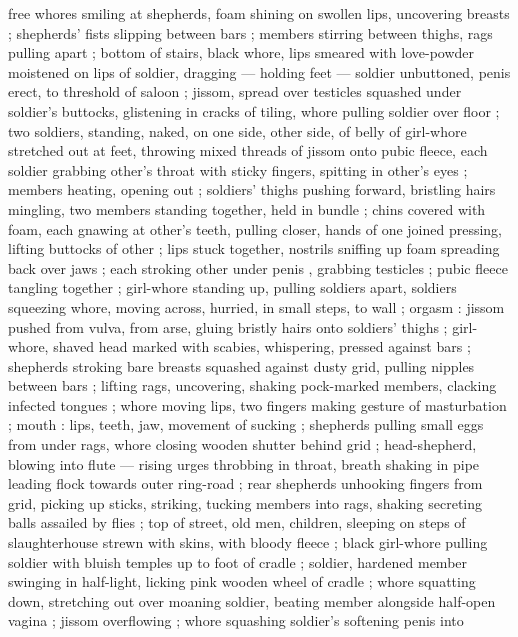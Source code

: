 free whores smiling at shepherds, foam shining on swollen lips, uncovering breasts ; shepherds'
fists slipping between bars ; members stirring between thighs, rags pulling apart ; bottom of
stairs, black whore, lips smeared with love-powder moistened on lips of soldier, dragging ---
holding feet --- soldier unbuttoned, penis erect, to threshold of saloon ; jissom, spread over
testicles squashed under soldier's buttocks, glistening in cracks of tiling, whore pulling soldier
over floor ; two soldiers, standing, naked, on one side, other side, of belly of girl-whore
stretched out at feet, throwing mixed threads of jissom onto pubic fleece, each soldier grabbing
other's throat with sticky fingers, spitting in other's eyes ; members heating, opening out ;
soldiers' thighs pushing forward, bristling hairs mingling, two members standing together, held in
bundle ; chins covered with foam, each gnawing at other's teeth, pulling closer, hands of one joined
pressing, lifting buttocks of other ; lips stuck together, nostrils sniffing up foam spreading back
over jaws ; each stroking other under penis{\td} , grabbing
testicles ; pubic fleece tangling together ; girl-whore standing up, pulling soldiers apart,
soldiers squeezing whore, moving across, hurried, in small steps, to wall ; orgasm : jissom pushed
from vulva, from arse, gluing bristly hairs onto soldiers' thighs ; girl-whore, shaved head marked
with scabies, whispering, pressed against bars ; shepherds stroking bare breasts squashed against
dusty grid, pulling nipples between bars ; lifting rags, uncovering, shaking pock-marked members,
clacking infected tongues ; whore moving lips, two fingers making gesture of masturbation ; mouth :
lips, teeth, jaw, movement of sucking ; shepherds pulling small eggs from under rags, whore closing
wooden shutter behind grid ; head-shepherd, blowing into flute --- rising urges throbbing in throat,
breath shaking in pipe {\dashcom} leading flock towards outer ring-road ; rear shepherds unhooking
fingers from grid, picking up sticks, striking, tucking members into rags, %
shaking secreting balls assailed by flies ; top of street, old men, children, sleeping on steps of
slaughterhouse strewn with skins, with bloody fleece ; black girl-whore pulling soldier with bluish
temples up to foot of cradle ; soldier, hardened member swinging in half-light, licking pink wooden
wheel of cradle ; whore squatting down, stretching out over moaning soldier, beating member
alongside half-open vagina ; jissom overflowing ; whore squashing soldier's softening penis into
